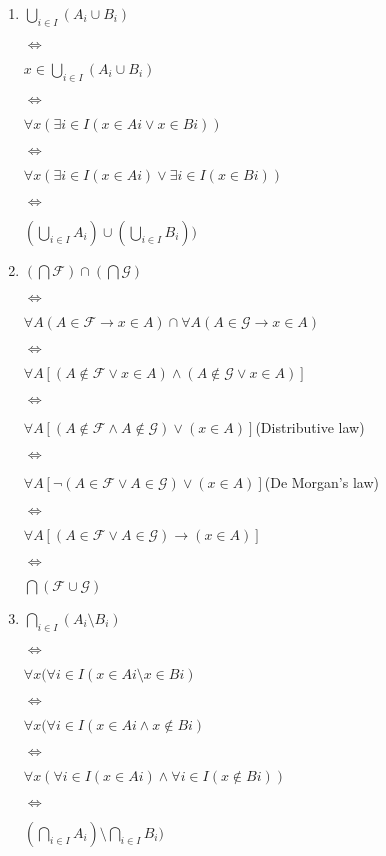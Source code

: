 \documentclass{article}
\begin{document}
\begin{enumerate}[label=(\alph*)]
    \item
    $\bigcup_{i \in I}(A_i \cup B_i)$ 
    
    $\Leftrightarrow$
    
    $ x \in \bigcup_{i \in I}(A_i \cup B_i)$
    
    $\Leftrightarrow$
    
    $\forall x (\exists i \in I (x \in Ai \lor x \in Bi))$
    
    $\Leftrightarrow$
    
    $\forall x (\exists i \in I (x \in Ai) \lor \exists i \in I (x \in Bi))$
    
    $\Leftrightarrow$
    
    $(\bigcup_{i \in I} A_i)\cup(\bigcup_{i \in I} B_i))$
    \item
    $(\bigcap \mathcal{F})\cap(\bigcap \mathcal{G})$
    
    $\Leftrightarrow$
    
    $\forall A(A \in \mathcal{F} \rightarrow x \in A) \cap \forall A(A \in \mathcal{G} \rightarrow x \in A)$
    
    $\Leftrightarrow$
    
    $\forall A[(A \notin \mathcal{F} \lor x \in A) \land (A \notin \mathcal{G} \lor x \in A)]$
    
    $\Leftrightarrow$
    
    $\forall A[(A \notin \mathcal{F} \land A \notin \mathcal{G}) \lor ( x \in A)]$(Distributive law)
    
    $\Leftrightarrow$
    
    $\forall A[\neg (A \in \mathcal{F} \lor A \in \mathcal{G}) \lor ( x \in A)]$(De Morgan's law)
    
    $\Leftrightarrow$
    
    $\forall A[(A \in \mathcal{F} \lor A \in \mathcal{G}) \rightarrow ( x \in A)]$
    
    $\Leftrightarrow$
    
    $\bigcap(\mathcal{F} \cup \mathcal{G})$
    \item
    $\bigcap_{i \in I}(A_i \setminus B_i)$
    
    $\Leftrightarrow$
    
    $\forall x (\forall i \in  I (x \in Ai \setminus x \in Bi)$
    
    $\Leftrightarrow$
    
    $\forall x (\forall i \in  I (x \in Ai \land x \notin Bi)$
    
    $\Leftrightarrow$
    
    $\forall x (\forall i \in  I (x \in Ai)\land \forall i \in  I (x \notin Bi))$
    
    $\Leftrightarrow$
    
    $(\bigcap_{i \in I} A_i) \setminus \bigcap_{i \in I} B_i)$
\end{enumerate}
\end{document}
